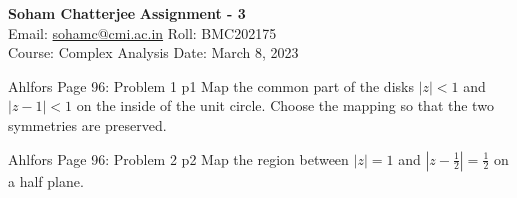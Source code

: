 \documentclass[a4paper, 11pt]{article}
\begin{document}
	
	
	\textsf{\noindent \large\textbf{Soham Chatterjee} \hfill \textbf{Assignment - 3}\\
		Email: \href{sohamc@cmi.ac.in}{sohamc@cmi.ac.in} \hfill Roll: BMC202175\\
		\normalsize Course: Complex Analysis \hfill Date: March 8, 2023}
	
	
	\begin{problem}{%
			Ahlfors Page 96: Problem 1
		}{p1%
		}
		Map the common part of the disks $|z|<1$ and $|z-1|<1$ on the inside of the unit circle. Choose the mapping so that the two symmetries are preserved.
	\end{problem}
	
	
	
	
	\begin{problem}{%
			Ahlfors Page 96: Problem 2
		}{p2%
		}
			Map the region between $|z|=1$ and $\left|z-\frac{1}{2}\right|=\frac{1}{2}$ on a half plane.
		
	\end{problem}                               
	
	\solve{
	
	}
	
	
	
\end{document}

